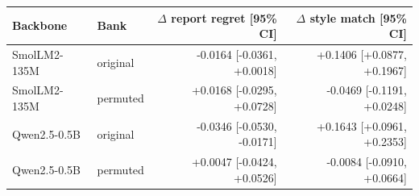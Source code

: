 \begin{tabular}{llrr}
\toprule
Backbone & Bank & $\Delta$ report regret [95\% CI] & $\Delta$ style match [95\% CI] \\
\midrule
SmolLM2-135M & original & -0.0164 [-0.0361, +0.0018] & +0.1406 [+0.0877, +0.1967] \\
SmolLM2-135M & permuted & +0.0168 [-0.0295, +0.0728] & -0.0469 [-0.1191, +0.0248] \\
Qwen2.5-0.5B & original & -0.0346 [-0.0530, -0.0171] & +0.1643 [+0.0961, +0.2353] \\
Qwen2.5-0.5B & permuted & +0.0047 [-0.0424, +0.0526] & -0.0084 [-0.0910, +0.0664] \\
\bottomrule
\end{tabular}
